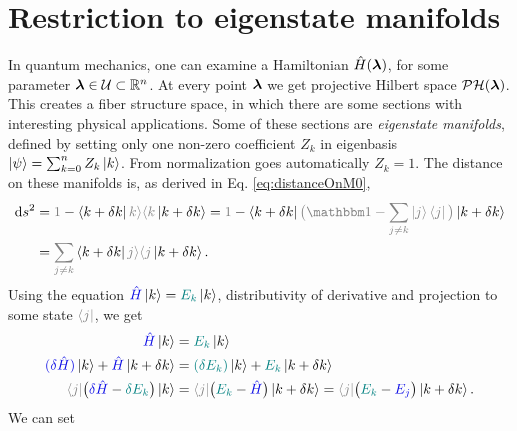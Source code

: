 \section{Restriction to eigenstate manifolds}
In quantum mechanics, one can examine a Hamiltonian $\hat{H}({\bm\lambda})$, for some parameter ${\bm\lambda}\in \mathcal U\subset \mathbb{R}^n$. At every point ${\bm\lambda}$ we get projective Hilbert space $\mathcal{PH}({\bm\lambda})$. This creates a fiber structure space, in which there are some sections with interesting physical applications. Some of these sections are \emph{eigenstate manifolds}, defined by setting only one non-zero coefficient $Z_k$ in eigenbasis $\ket{\psi}=\sum_{k=0}^n Z_k \ket{k}$. From normalization goes automatically $Z_k=1$. The distance on these manifolds is, as derived in Eq. \ref{eq:distanceOnM0},
\begin{equation}
    \begin{split}
        \d s^2 &= \textcolor{gray}{1}-\bra{k+\delta k}\textcolor{gray}{k\rangle \langle k}\ket{k+\delta k}=\textcolor{gray}{1}-\bra{k+\delta k}\textcolor{gray}{\big(\Id-\sum_{j\neq k} \ket{j}\bra{j}\big)}\ket{k+\delta k} \\
        &= \textcolor{gray}{\sum_{j\neq k}}\bra{k+\delta k}\textcolor{gray}{j\rangle \langle j}\ket{k+\delta k}.
        \label{eq:dsDerivation}
    \end{split}
\end{equation}
Using the \Schrodinger equation $\textcolor{blue}{\HH}\ket{k}=\textcolor{teal}{E_k} \ket{k}$, distributivity of derivative and projection to some state $\textcolor{gray}{\bra{j}}$, we get
\begin{equation}
    \begin{split}
        \textcolor{blue}{\HH}\ket{k} &= \textcolor{teal}{E_k}\ket{k}\\
        \textcolor{blue}{(\delta \HH)}\ket{k} +\textcolor{blue}{\HH}\ket{k+\delta k} &=\textcolor{teal}{(\delta E_k)}\ket{k} +\textcolor{teal}{E_k}\ket{k+\delta k}\\
         \textcolor{gray}{\bra{j}}\big(\textcolor{blue}{\delta \HH}-\textcolor{teal}{\delta E_k}\big)\ket{k}&=\textcolor{gray}{\bra{j}}\big(\textcolor{teal}{E_k}-\textcolor{blue}{\HH}\big)\ket{k+\delta k}=\textcolor{gray}{\bra{j}}\big(\textcolor{teal}{E_k}-\textcolor{blue}{E_j}\big)\ket{k+\delta k}.
    \end{split}
\end{equation}
We can set
